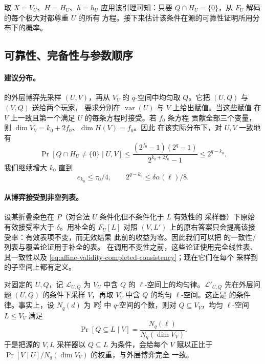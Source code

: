 取 $X=V_U$、$H=H_U$、$h=h_U$ 应用该引理可知：只要
$Q\cap H_U=\{0\}$，从 $F_U$ 解码的每个极大对都尊重 $U$ 的所有
方程。接下来估计该条件在源的可靠性证明所用分布下的概率。

\subsection{可靠性、完备性与参数顺序}

\paragraph{建议分布。}
\cite[Section~5.2]{DKKMS25} 的外层博弈先采样 $(U,V)$，再从 $V_V$
的 $q$-空间中均匀取 $Q$。它把 $(U,Q)$ 与 $(V,Q)$ 送给两个玩家，
要求分别在 $\operatorname{var}(U)$ 与 $V$ 上给出赋值。当这些赋值
在 $V$ 上一致且第一个满足 $U$ 的每条方程时接受。若 $f_0$ 条方程
贡献全部三个变量，则 $\dim V_V=k_0+2f_0$、$\dim H(V)=f_0$。因此
在该实际分布下，对 $U,V$ 一致地有
\begin{equation}
 \Pr[Q\cap H_U\ne\{0\}\mid U,V]
 \le\frac{(2^{f_0}-1)(2^q-1)}{2^{k_0+2f_0}-1}
 \le2^{q-k_0}.
 \label{eq:affine-validity-advice-loss}
\end{equation}
我们继续增大 $k_0$ 直到
\begin{equation}
 e_{k_0}\le\tau_0/4,
 \qquad 2^{q-k_0}\le\delta\alpha(\ell)/8.
 \label{eq:affine-validity-k-margins}
\end{equation}

\paragraph{从博弈接受到非空列表。}
设某折叠染色在 $P$（对合法 $U$ 条件化但不条件化于 $L$ 有效性的
采样器）下原始有效接受率大于 $\delta$。用补全的 $F_U[L]$ 对照
$(V,L')$ 上的原右答案只会提高该接受率：有效表项不变，而无效结果
此前的收益为零。因此我们可以把 \cite[Lemma~5.3, Claim~5.6, and
Equation~(5.1)]{DKKMS25} 的一致性/列表与覆盖论证用于补全的表。
在调用不变性之前，这些论证使用完全线性表、其一致性以及
\eqref{eq:affine-validity-completed-consistency}；现在它们在每个
采样到的子空间上都有定义。

对固定的 $U,Q$，记 $\mathcal L_{U,Q}$ 为 $V_U$ 中含 $Q$ 的
$\ell$-空间上的均匀律。$\mathcal L'_{U,Q}$ 先在外层问题 $(U,Q)$
的条件下采样 $V$，再取 $V_V$ 中含 $Q$ 的均匀 $\ell$-空间。这正是
\cite[Lemma~4.11]{DKKMS25} 的条件律。事实上，设 $N_q(d)$ 为
$\mathbb F_2^d$ 中 $q$-空间的个数，则对 $Q\subseteq V_V$，均匀
$\ell$-空间 $L\le V_V$ 满足
\[
 \Pr[Q\subseteq L\mid V]=\frac{N_q(\ell)}{N_q(\dim V_V)}.
\]
于是把源的 $V,L$ 采样器以 $Q\subseteq L$ 为条件，会给每个 $V$
赋以正比于 $\Pr[V\mid U]/N_q(\dim V_V)$ 的权重，与外层博弈完全
一致。

